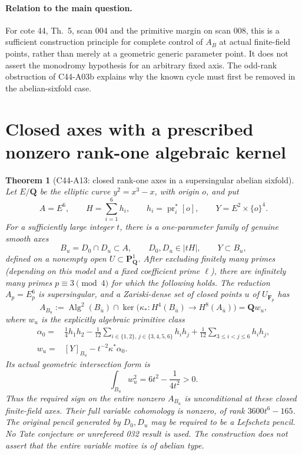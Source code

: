 \documentclass[11pt]{article}
\newtheorem{theorem}{Theorem}[section]
\theoremstyle{remark}\newtheorem{remark}[theorem]{Remark}
\DeclareMathOperator{\Alg}{Alg}
\begin{document}
\paragraph{Relation to the main question.}
For cote 44, Th.~5, scan 004 and the primitive margin on scan 008,
this is a sufficient construction principle for complete control
of \(A_B\) at actual finite-field points, rather than merely at
a geometric generic parameter point. It does not assert the
monodromy hypothesis for an arbitrary fixed axis.
The odd-rank obstruction of C44-A03b explains why the known
cycle must first be removed in the abelian-sixfold case.


\section{Closed axes with a prescribed nonzero rank-one algebraic kernel}
\label{sec:c44-a13}

\begin{theorem}[C44-A13: closed rank-one axes in a supersingular abelian sixfold]
Let $E/\mathbf Q$ be the elliptic curve $y^2=x^3-x$, with origin $o$,
and put
\[
 A=E^6,\qquad H=\sum_{i=1}^6h_i,\qquad
 h_i=\operatorname{pr}_i^*[o],\qquad
 Y=E^2\times\{o\}^4.
\]
For a sufficiently large integer $t$, there is a one-parameter family
of genuine smooth axes
\[
 B_u=D_0\cap D_u\subset A,\qquad D_0,D_u\in|tH|,
 \qquad Y\subset B_u,
 \tag{A13.1}
\]
defined on a nonempty open $U\subset\mathbf P^1_{\mathbf Q}$.
After excluding finitely many primes (depending on this model and a
fixed coefficient prime $\ell$), there are infinitely many primes
$p\equiv3\pmod4$ for which the following holds.
The reduction $A_p=E_p^6$ is supersingular, and a Zariski-dense set
of closed points $u$ of $U_{\mathbf F_p}$ has
\[
 A_{B_u}:=\Alg^2(B_{\bar u})\cap
 \ker\bigl(\kappa_*:H^4(B_{\bar u})\longrightarrow H^8(A_{\bar u})\bigr)
       =\mathbf Q w_u,
 \tag{A13.2}
\]
where $w_u$ is the explicitly algebraic primitive class
\[
 \begin{split}
 \alpha_0={}&\frac14h_1h_2
 -\frac1{12}\sum_{i\in\{1,2\},\,j\in\{3,4,5,6\}}h_ih_j
 +\frac1{12}\sum_{3\leq i<j\leq6}h_ih_j,\\
 w_u={}&[Y]_{B_u}-t^{-2}\kappa^*\alpha_0.
 \end{split}
 \tag{A13.3}
\]
Its actual geometric intersection form is
\[
                    \int_{B_u}w_u^2
                       =6t^2-\frac1{4t^2}>0.
 \tag{A13.4}
\]
Thus the required sign on the entire nonzero $A_{B_u}$ is
unconditional at these closed finite-field axes. Their full variable
cohomology is nonzero, of rank $3600t^6-165$.
The original pencil generated by $D_0,D_u$ may be required to be a
Lefschetz pencil. No Tate conjecture or unrefereed 032 result is used.
The construction does not assert that the entire variable motive
is of abelian type.
\end{theorem}
\end{document}
